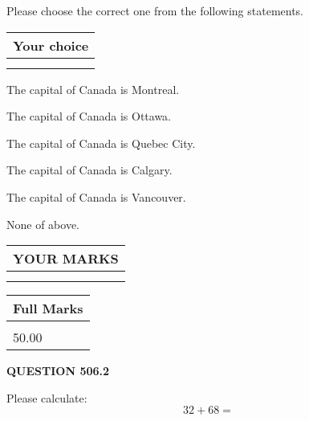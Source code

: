 \documentclass[12pt]{article}
\begin{document}
  
Please choose the correct one from the following statements.
  
  
\noindent\hspace{3.0in} \begin{tabular}{|l|}
\hline
Your choice \\
\hline
 \\ 
 \\ 
\hline
\end{tabular}
  
  
 
 
The capital of Canada is Montreal.
 
 
The capital of Canada is Ottawa.
 
 
The capital of Canada is Quebec City.
 
 
The capital of Canada is Calgary.
 
 
The capital of Canada is Vancouver.
 
 
 None of above.
 
 
  
\vspace{0.2in}
  
\noindent\begin{tabular}{|l|}
\hline
 YOUR MARKS  \\
\hline
 \\ 
 \\ 
\hline
\end{tabular}
\hspace{0.05in} \begin{tabular}{|l|}
\hline
 Full Marks  \\
\hline
 \\ 
50.00 \\
\hline
\end{tabular}
{\textbf{\Large{QUESTION
506.2 
}}}
  
  
 
Please calculate:
\begin{equation}
32 +  %
68 = \nonumber
\end{equation}
 

 

 
   
   
 \vspace{0.2in}
 
   
   
   
   
\end{document}
